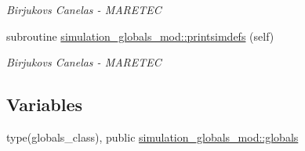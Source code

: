 \begin{DoxyCompactItemize}
\begin{DoxyCompactList}\small\item\em Birjukovs Canelas -\/ M\+A\+R\+E\+T\+EC \end{DoxyCompactList}\item 
subroutine \hyperlink{namespacesimulation__globals__mod_ad331ccf019de7ed531e37c655600f90f}{simulation\+\_\+globals\+\_\+mod\+::printsimdefs} (self)
\begin{DoxyCompactList}\small\item\em Birjukovs Canelas -\/ M\+A\+R\+E\+T\+EC \end{DoxyCompactList}\end{DoxyCompactItemize}
\subsection*{Variables}
\begin{DoxyCompactItemize}
\item 
type(globals\+\_\+class), public \hyperlink{namespacesimulation__globals__mod_a04123075b6de525703edb89697fc39e9}{simulation\+\_\+globals\+\_\+mod\+::globals}
\end{DoxyCompactItemize}
